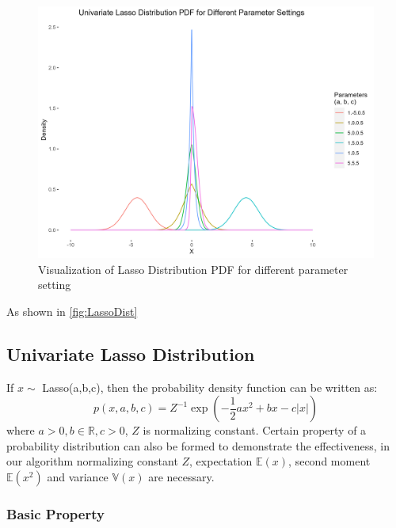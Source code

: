 \begin{figure}[h]
	\includegraphics[width=\linewidth]{Lasso_distribution}
	\caption{Visualization of Lasso Distribution PDF for different parameter setting}
	\label{fig:LassoDist}
\end{figure}
As shown in \autoref{fig:LassoDist}


         

\subsection{Univariate Lasso Distribution}
If $x \sim $ Lasso(a,b,c), then the probability density function can be written as:
\begin{equation}
	p(x,a,b,c) = Z^{-1}\exp(-\frac{1}{2}ax^2+bx-c|x|)
\end{equation}
where $a > 0, b \in \mathbb{R}, c > 0$, $Z$ is normalizing constant. Certain property of a probability distribution can also be formed to demonstrate the effectiveness, in our algorithm normalizing constant $Z$, expectation $\mathbb{E}(x)$, second moment $\mathbb{E}(x^2)$ and variance $\mathbb{V}(x)$ are necessary.
\subsubsection{Basic Property}
